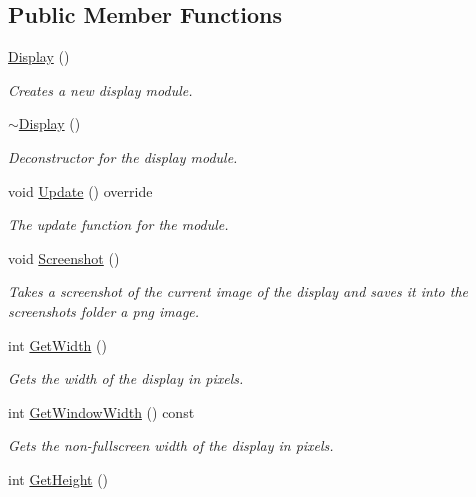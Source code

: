 \subsection*{Public Member Functions}
\begin{DoxyCompactItemize}
\item 
\hyperlink{class_flounder_1_1_display_a78ec70fcff7c51125a43daf93cd987a4}{Display} ()
\begin{DoxyCompactList}\small\item\em Creates a new display module. \end{DoxyCompactList}\item 
\hyperlink{class_flounder_1_1_display_aca6463f307f956c2b7627abc8f3d68c5}{$\sim$\+Display} ()
\begin{DoxyCompactList}\small\item\em Deconstructor for the display module. \end{DoxyCompactList}\item 
void \hyperlink{class_flounder_1_1_display_a1432d6de0e572b36116db97d3aeee1e5}{Update} () override
\begin{DoxyCompactList}\small\item\em The update function for the module. \end{DoxyCompactList}\item 
void \hyperlink{class_flounder_1_1_display_a67b31b74e1b328a179ff5561b61730ac}{Screenshot} ()
\begin{DoxyCompactList}\small\item\em Takes a screenshot of the current image of the display and saves it into the screenshots folder a png image. \end{DoxyCompactList}\item 
int \hyperlink{class_flounder_1_1_display_a6aef126ee5b160a8721d9f9961543bac}{Get\+Width} ()
\begin{DoxyCompactList}\small\item\em Gets the width of the display in pixels. \end{DoxyCompactList}\item 
int \hyperlink{class_flounder_1_1_display_a6c2c98d3d5eba88c6a8c053018d2c1b3}{Get\+Window\+Width} () const
\begin{DoxyCompactList}\small\item\em Gets the non-\/fullscreen width of the display in pixels. \end{DoxyCompactList}\item 
int \hyperlink{class_flounder_1_1_display_aa9fe6379582e7b381ad3bc31442ad305}{Get\+Height} ()

\end{DoxyCompactItemize}
